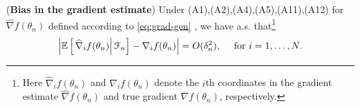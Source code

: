 \begin{lemma}(\textbf{Bias in the gradient estimate})
\label{lemma:1rdsa-bias}
Under (A1),(A2),(A4),(A5),(A11),(A12) for $\widehat\nabla f(\theta_n)$ defined according to  \eqref{eq:grad-gen} , we have a.s. that\footnote{Here $\widehat\nabla_i f(\theta_n)$ and $\nabla_i f(\theta_n)$ denote the $i$th coordinates in the gradient estimate $\widehat\nabla f(\theta_n)$ and true gradient $\nabla f(\theta_n)$, respectively.}
\begin{align}
 \left| \mathbb{E}\left[\left.\widehat\nabla_i f(\theta_n)\right| \mathcal{F}_n \right] - \nabla_i f(\theta_n)\right| = O(\delta_n^2),  \quad \text{ for } i=1,\ldots,N.
\end{align} 
\end{lemma}

